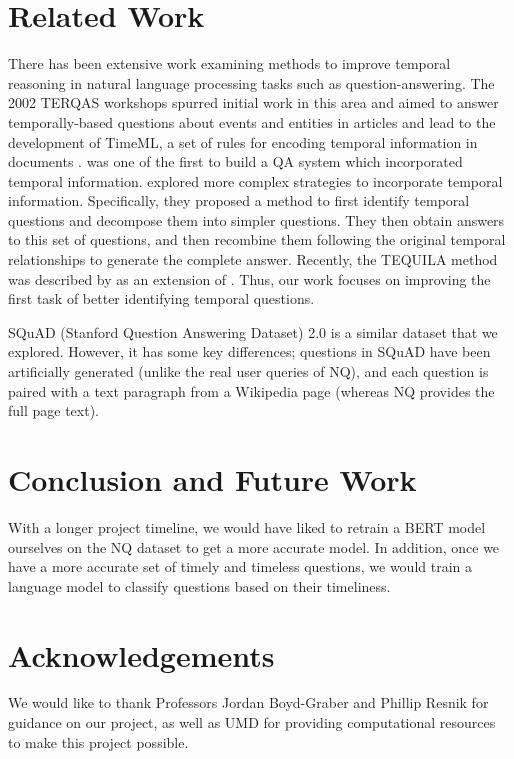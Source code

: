 \documentclass{article}
\begin{document}


\section{Related Work}

There has been extensive work examining methods to improve temporal reasoning in
natural language processing tasks such as question-answering. The 2002 TERQAS
workshops spurred initial work in this area and aimed to answer temporally-based
questions about events and entities in articles and lead to the development of
TimeML, a set of rules for encoding temporal information in documents
\cite{radev2002using}. \cite{breck2000another} was one of the first to build a
QA system which incorporated temporal information. \cite{saquete2009enhancing}
explored more complex strategies to incorporate temporal information.
Specifically, they proposed a method to first identify temporal questions and
decompose them into simpler questions. They then obtain answers to this set of
questions, and then recombine them following the original temporal relationships
to generate the complete answer. Recently, the TEQUILA method was described by
\cite{jia2018tequila} as an extension of \cite{saquete2009enhancing}. Thus, our
work focuses on improving the first task of better identifying temporal
questions.


SQuAD (Stanford Question Answering Dataset) 2.0 \cite{squaddataset} is a similar
dataset that we explored. However, it has some key differences; questions in
SQuAD have been artificially generated (unlike the real user queries of NQ), and
each question is paired with a text paragraph from a Wikipedia page (whereas NQ
provides the full page text).




\section{Conclusion and Future Work}
With a longer project timeline, we would have liked to retrain a BERT model
ourselves on the NQ dataset to get a more accurate model. In addition, once we
have a more accurate set of timely and timeless questions, we would train a
language model to classify questions based on their timeliness.


\section*{Acknowledgements}

We would like to thank Professors Jordan Boyd-Graber and Phillip Resnik for
guidance on our project, as well as UMD for providing computational resources to
make this project possible.




\end{document}
